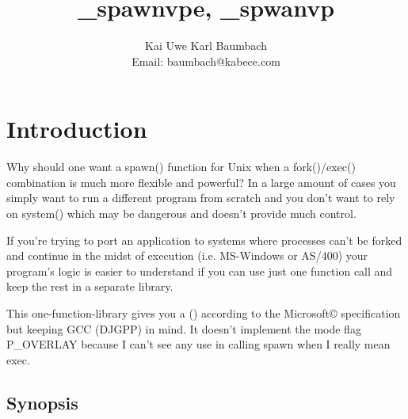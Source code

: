 \documentclass[11pt,a4paper]{article}%
\begin{document}
\pagestyle{headings}

\nwdocspar
\title{\_spawnvpe, \_spwanvp}
  \author{Kai Uwe Karl Baumbach\\
  Email: baumbach@kabece.com}
  
\maketitle

\tableofcontents

\nwenddocs{}\nwdocspar
\section {Introduction}

Why should one want a {\Tt{}spawn()} function for Unix when a 
{\Tt{}fork()}/{\Tt{}exec()} combination is much more flexible and
powerful? In a large amount of cases you simply want to run a
different program from scratch and you don't want to rely
on {\Tt{}system()} which may be dangerous and doesn't provide
much control.

If you're trying to port an application to systems where 
processes can't be forked and continue in the midst of
execution (i.e. MS-Windows or AS/400) your program's 
logic is easier to understand if you can use just one 
function call and keep the rest in a separate library.

This one-function-library gives you a {\Tt{}()} according to the 
Micro\-soft\copyright{} specification but keeping GCC (DJGPP) 
in mind. It doesn't implement the mode flag {\Tt{}P{\_}OVERLAY} 
because I can't see any use in calling spawn when I really 
mean exec.

\subsection {Synopsis}
\end{document}

